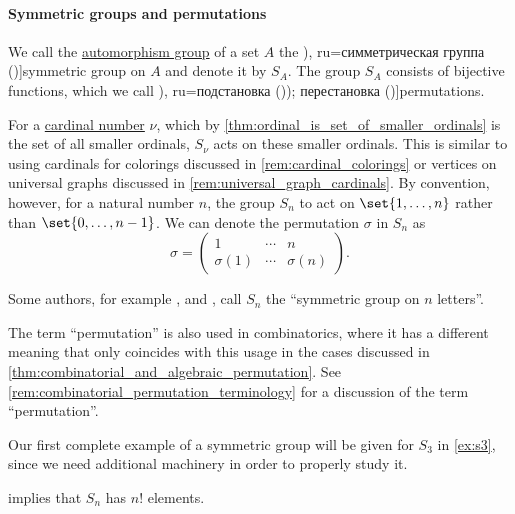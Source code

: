 \paragraph{Symmetric groups and permutations}

\begin{definition}\label{def:symmetric_group}
  We call the \hyperref[def:automorphism_group]{automorphism group} of a set \( A \) the \term[bg=симетрична група (\cite[376]{Обрешков1962ВисшаАлгебра}), ru=симметрическая группа (\cite[154]{Винберг2014КурсАлгебры})]{symmetric group} on \( A \) and denote it by \( S_A \). The group \( S_A \) consists of bijective functions, which we call \term[bg=субституция (\cite[80]{ГеновМиховскиМоллов1991Алгебра}), ru=подстановка (\cite[154]{Винберг2014КурсАлгебры})); перестановка (\cite[sec. 4.2]{Тыртышников2007ЛинейнаяАлгебра})]{permutations}.

  For a \hyperref[def:cardinal]{cardinal number} \( \nu \), which by \cref{thm:ordinal_is_set_of_smaller_ordinals} is the set of all smaller ordinals, \( S_\nu \) acts on these smaller ordinals. This is similar to using cardinals for colorings discussed in \cref{rem:cardinal_colorings} or vertices on universal graphs discussed in \cref{rem:universal_graph_cardinals}. By convention, however, for a natural number \( n \), the group \( S_n \) to act on \( \set{ 1, \ldots, n } \) rather than \( \set{ 0, \ldots, n - 1 } \). We can denote the permutation \( \sigma \) in \( S_n \) as
  \begin{equation*}
    \sigma
    =
    \begin{pmatrix}
      1         & \cdots & n \\
      \sigma(1) & \cdots & \sigma(n)
    \end{pmatrix}.
  \end{equation*}
\end{definition}
\begin{comments}
  \item Some authors, for example ,  and , call \( S_n \) the \enquote{symmetric group on \( n \) letters}.

  \item The term \enquote{permutation} is also used in combinatorics, where it has a different meaning that only coincides with this usage in the cases discussed in \cref{thm:combinatorial_and_algebraic_permutation}. See \cref{rem:combinatorial_permutation_terminology} for a discussion of the term \enquote{permutation}.

  \item Our first complete example of a symmetric group will be given for \( S_3 \) in \cref{ex:s3}, since we need additional machinery in order to properly study it.

  \item {} implies that \( S_n \) has \( n! \) elements.
\end{comments}

